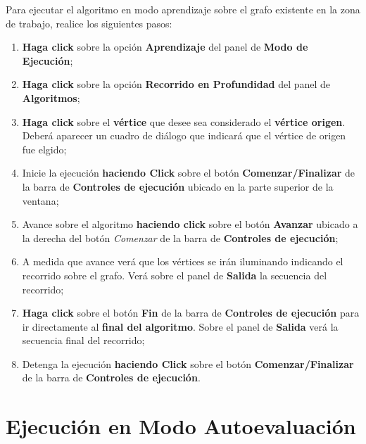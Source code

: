 \documentclass{book}
\begin{document}
Para ejecutar el algoritmo en modo aprendizaje sobre el grafo existente en la zona de trabajo, realice los siguientes pasos:
\medskip

\begin{enumerate}
	\itemsep=8pt \topsep=0pt \partopsep=0pt \parskip=0pt \parsep=0pt

	\item \textbf{Haga click} sobre la opción \textbf{Aprendizaje} del panel de \textbf{Modo de Ejecución};

	\item \textbf{Haga click} sobre la opción \textbf{Recorrido en Profundidad} del panel de \textbf{Algoritmos};

	\item \textbf{Haga click} sobre el \textbf{vértice} que desee sea considerado el \textbf{vértice origen}. Deberá aparecer un cuadro de diálogo que indicará que el vértice de origen fue elgido;

	\item Inicie la ejecución \textbf{haciendo Click} sobre el botón \textbf{Comenzar/Finalizar} de la barra de \textbf{Controles de ejecución} ubicado en la parte superior de la ventana;

	\item Avance sobre el algoritmo \textbf{haciendo click} sobre el botón \textbf{Avanzar} ubicado a la derecha del botón \textit{Comenzar} de la barra de \textbf{Controles de ejecución};

	\item A medida que avance verá que los vértices se irán iluminando indicando el recorrido sobre el grafo. Verá sobre el panel de \textbf{Salida} la secuencia del recorrido;

	\item \textbf{Haga click} sobre el botón \textbf{Fin} de la barra de \textbf{Controles de ejecución} para ir directamente al \textbf{final del algoritmo}. Sobre el panel de \textbf{Salida} verá la secuencia final del recorrido;

	\item Detenga la ejecución \textbf{haciendo Click} sobre el botón \textbf{Comenzar/Finalizar} de la barra de \textbf{Controles de ejecución}.

\end{enumerate}
\medskip



\section{Ejecución en Modo Autoevaluación}
\end{document}
